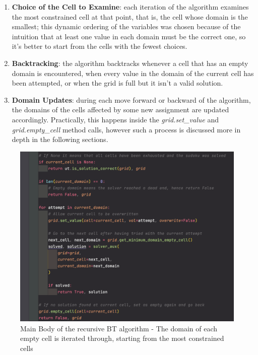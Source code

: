 \begin{enumerate}
    \item \textbf{Choice of the Cell to Examine}: each iteration of the algorithm examines the most constrained cell at that point, that is, the cell whose domain is the smallest; this dynamic ordering of the variables was chosen because of the intuition that at least one value in each domain must be the correct one, so it's better to start from the cells with the fewest choices.

    \item \textbf{Backtracking}: the algorithm backtracks whenever a cell that has an empty domain is encountered, when every value in the domain of the current cell has been attempted, or when the grid is full but it isn't a valid solution.

    \item \textbf{Domain Updates}: during each move forward or backward of the algorithm, the domains of the cells affected by some new assignment are updated accordingly. Practically, this happens inside the \textit{grid.set\_value} and \textit{grid.empty\_cell} method calls, however such a process is discussed more in depth in the following sections.
\end{enumerate}

\begin{figure}[h]
    \centering
    \includegraphics[scale=0.65]{assignment-1/images/cp/main.png}
    \caption{Main Body of the recursive BT algorithm - The domain of each empty cell is iterated through, starting from the most constrained cells}
    \label{fig:main_1}
\end{figure}

